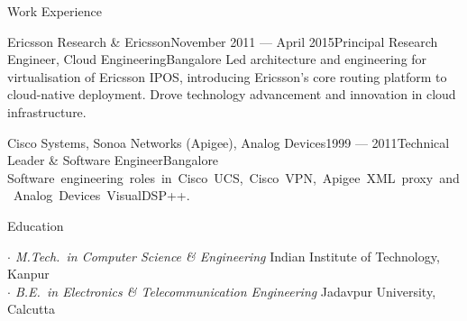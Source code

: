 \documentclass{resume} %
\begin{document}
\begin{rSection}{Work Experience}
\begin{rSubsection}{Ericsson Research \& Ericsson}{November 2011 --- April 2015}{Principal Research Engineer, Cloud Engineering}{Bangalore}
{Led architecture and engineering for virtualisation of Ericsson IPOS, introducing Ericsson's core routing platform to cloud-native deployment. Drove technology advancement and innovation in cloud infrastructure.}
\end{rSubsection}

\begin{rSubsection}{Cisco Systems, Sonoa Networks (Apigee), Analog Devices}{1999 --- 2011}{Technical Leader \& Software Engineer}{Bangalore}
{\mbox{Software engineering roles in Cisco UCS, Cisco VPN, Apigee XML proxy and Analog Devices VisualDSP++.}}
\end{rSubsection}

\end{rSection}


\begin{rSection}{Education}

{\em $\cdot$ M.Tech.\ in Computer Science \& Engineering} \hfill Indian Institute of Technology, Kanpur \\
{\em $\cdot$ B.E.\ in Electronics \& Telecommunication Engineering} \hfill Jadavpur University, Calcutta

\end{rSection}
\end{document}
